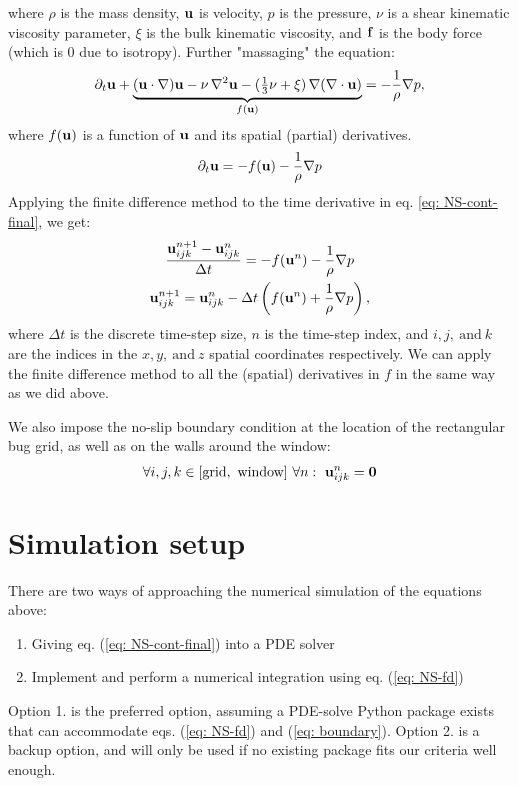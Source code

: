 \documentclass{article}
\numberwithin{figure}{section}  %
\numberwithin{equation}{section}  %
\begin{document}
where $\rho$ is the mass density, $\mathbf{u}$ is velocity, $p$ is the pressure, $\nu$ is a shear kinematic viscosity parameter, $\xi$ is the bulk kinematic viscosity, and $\mathbf{f}$ is the body force (which is 0 due to isotropy).
Further "massaging" the equation:
\begin{gather}
    \partial_t \mathbf{u} + \underbrace{(\mathbf {u} \cdot \nabla) \mathbf{u} -\nu \,\nabla ^{2}\mathbf{u}-({\tfrac {1}{3}}\nu +\xi )\,\nabla (\nabla \cdot \mathbf{u})}_{f\left(\mathbf{u}\right)} =-{\frac {1}{\rho }}\nabla p,
\end{gather}
where $f(\mathbf{u})$ is a function of $\mathbf{u}$ and its spatial (partial) derivatives.
\begin{gather}
    \partial_t \mathbf{u}  = -f(\mathbf{u}) -{\frac {1}{\rho }}\nabla p \label{eq: NS-cont-final}
\end{gather}
Applying the finite difference method to the time derivative in eq. \ref{eq: NS-cont-final}, we get:
\begin{gather}
    \frac{\mathbf{u}_{ijk}^{n+1} - \mathbf{u}_{ijk}^n}{\Delta t} = -f(\mathbf{u}^n) -{\frac {1}{\rho }}\nabla p \\
    \mathbf{u}_{ijk}^{n+1} = \mathbf{u}_{ijk}^n - \Delta t \left(f(\mathbf{u}^n) + {\frac {1}{\rho }}\nabla p\right), \label{eq: NS-fd}
\end{gather}
where $\Delta t$ is the discrete time-step size, $n$ is the time-step index, and $i,j,~\text{and}~k$ are the indices in the $x,y,~\text{and}~z$ spatial coordinates respectively. We can apply the finite difference method to all the (spatial) derivatives in $f$ in the same way as we did above.

We also impose the no-slip boundary condition at the location of the rectangular bug grid, as well as on the walls around the window:
\begin{gather}
    \forall i,j,k \in [\text{grid},~\text{window}] ~\forall n:~ \mathbf{u}_{ijk}^n = \mathbf{0} \label{eq: boundary}
\end{gather}

\newpage

\section{Simulation setup}
There are two ways of approaching the numerical simulation of the equations above:
\begin{enumerate}
    \item Giving eq. (\ref{eq: NS-cont-final}) into a PDE solver
    \item Implement and perform a numerical integration using eq. (\ref{eq: NS-fd})
\end{enumerate}
Option 1. is the preferred option, assuming a PDE-solve Python package exists that can accommodate eqs. (\ref{eq: NS-fd}) and (\ref{eq: boundary}). Option 2. is a backup option, and will only be used if no existing package fits our criteria well enough.
\end{document}
